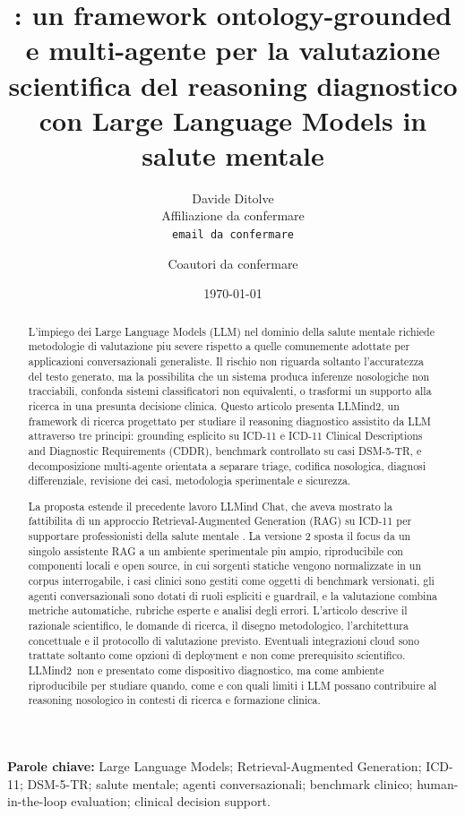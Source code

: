 \documentclass[11pt,a4paper]{article}
\title{\textbf{\llmind: un framework ontology-grounded e multi-agente per la valutazione scientifica del reasoning diagnostico con Large Language Models in salute mentale}}
\author{
  Davide Ditolve\\
  \small Affiliazione da confermare\\
  \small \texttt{email da confermare}
  \and
  Coautori da confermare
}
\date{\today}
\newcommand{\llmind}{LLMind2}
\begin{document}
\maketitle

\begin{abstract}
L'impiego dei Large Language Models (LLM) nel dominio della salute mentale richiede metodologie di valutazione piu severe rispetto a quelle comunemente adottate per applicazioni conversazionali generaliste. Il rischio non riguarda soltanto l'accuratezza del testo generato, ma la possibilita che un sistema produca inferenze nosologiche non tracciabili, confonda sistemi classificatori non equivalenti, o trasformi un supporto alla ricerca in una presunta decisione clinica. Questo articolo presenta \llmind, un framework di ricerca progettato per studiare il reasoning diagnostico assistito da LLM attraverso tre principi: grounding esplicito su ICD-11 e ICD-11 Clinical Descriptions and Diagnostic Requirements (CDDR), benchmark controllato su casi DSM-5-TR, e decomposizione multi-agente orientata a separare triage, codifica nosologica, diagnosi differenziale, revisione dei casi, metodologia sperimentale e sicurezza.

La proposta estende il precedente lavoro LLMind Chat, che aveva mostrato la fattibilita di un approccio Retrieval-Augmented Generation (RAG) su ICD-11 per supportare professionisti della salute mentale \citep{cremaschi2025decoding}. La versione 2 sposta il focus da un singolo assistente RAG a un ambiente sperimentale piu ampio, riproducibile con componenti locali e open source, in cui sorgenti statiche vengono normalizzate in un corpus interrogabile, i casi clinici sono gestiti come oggetti di benchmark versionati, gli agenti conversazionali sono dotati di ruoli espliciti e guardrail, e la valutazione combina metriche automatiche, rubriche esperte e analisi degli errori. L'articolo descrive il razionale scientifico, le domande di ricerca, il disegno metodologico, l'architettura concettuale e il protocollo di valutazione previsto. Eventuali integrazioni cloud sono trattate soltanto come opzioni di deployment e non come prerequisito scientifico. \llmind\ non e presentato come dispositivo diagnostico, ma come ambiente riproducibile per studiare quando, come e con quali limiti i LLM possano contribuire al reasoning nosologico in contesti di ricerca e formazione clinica.
\end{abstract}

\noindent\textbf{Parole chiave:} Large Language Models; Retrieval-Augmented Generation; ICD-11; DSM-5-TR; salute mentale; agenti conversazionali; benchmark clinico; human-in-the-loop evaluation; clinical decision support.
\end{document}
